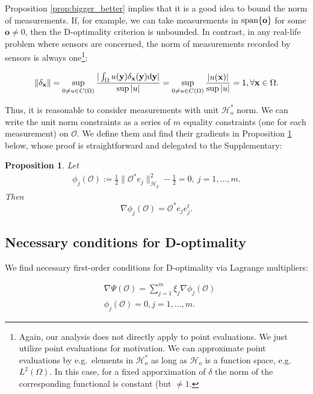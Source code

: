 \documentclass[ba]{imsart}
\newcommand{\der}{\text{\textup{d}}}
\providecommand{\x}{}
\renewcommand{\x}{\mathbf{x}}
\newcommand{\y}{\mathbf{y}}
\newcommand{\hilp}{\mathcal{H}_p}
\newcommand{\hilo}{\mathcal{H}_o}
\newcommand{\obs}{\mathcal{O}}
\newcommand{\tar}{\Psi}
\newcommand{\meas}{\mathbf{o}}
\theoremstyle{plain}
\newtheorem{proposition}[theorem]{Proposition}
\theoremstyle{definition}
\theoremstyle{remark}
\begin{document}
Proposition \ref{prop:bigger_better} implies that it is a good idea to
bound the norm of measurements. If, for example, we can take
measurements in $\textup{span}\{\meas\}$ for some $\meas \neq 0$, then
the D-optimality criterion is unbounded. In contrast, in any real-life
problem where sensors are concerned, the norm of measurements recorded
by sensors is always one\footnote{Again, our analysis does not
directly apply to point evaluations. We just utilize point evaluations
for motivation. We can approximate point evaluations by e.g.~elements
in $\hilo^*$ as long as $\hilo$ is a function space,
e.g.~$L^2(\Omega)$. In this case, for a fixed apporximation of
$\delta$ the norm of the corresponding functional is constant (but
$\neq 1$.}:

\begin{equation}
  \| \delta_{\x} \| = \sup_{0 \neq u \in C(\Omega)}
  \frac{
    |\int_{\Omega}u(\y) \delta_{\x}(\y) \der \y|
  }{
    \sup|u|
  } = \sup_{0 \neq u \in C(\Omega)} \frac{|u(\x)|}{\sup|u|} = 1,
  \forall \x \in \Omega.
\end{equation}

Thus, it is reasonable to consider measurements with unit $\hilo^*$
norm. We can write the unit norm constraints as a series of $m$
equality constraints (one for each measurement) on $\obs$. We define
them and find their gradients in Proposition
\ref{prop:constraints_grad} below, whose proof is straightforward and
delegated to the Supplementary:

\begin{proposition}\label{prop:constraints_grad}
  Let
  \begin{align*}
    \phi_j(\obs) :=\frac12 \| \obs^* e_j\|_{\hilp}^2 - \frac12 = 0,\ j=1,\dots,m.
  \end{align*}
  Then
  \begin{equation*}
\nabla \phi_j(\obs) = \obs^* e_je_j^t.
  \end{equation*}
\end{proposition}







\subsection{Necessary conditions for D-optimality}
We find necessary first-order conditions for D-optimality via Lagrange
multipliers:

\begin{align}
  &\nabla \tar(\obs) = \sum_{j=1}^m \xi_j \nabla \phi_j (\obs)
  \label{eq:Lagrange_mult1} \\
    &\phi_j(\obs) = 0, j = 1,\dots,m. \label{eq:Lagrange_mult2}
\end{align}
\end{document}
